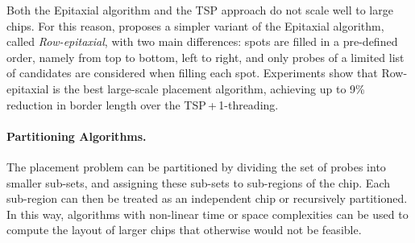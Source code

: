 \documentclass[english]{lni}
\newcommand{\ignore}[1]{}
\begin{document}
\ignore{
The major problem with the epitaxial and the TSP-based algorithm is that they
have at least quadratic time complexity and thus are not scalable for the
latest million-probe microarrays. According to their experiments, the TSP
approach needed around 32 minutes to produce the layout of a 200\,x\,200 chip,
whereas the epitaxial algorithm needed 74 minutes on average. For a 500\,x\,500
chip, the TSP took over 30 hours to complete, whereas the epitaxial algorithm
did not complete ``due to prohibitively large running time or memory
requirements'' \cite{KAHNG02}.
}

\ignore{
This observation has led to the development of two new algorithms by
\cite{KAHNG03A}. The first one, called sliding-window matching (SWM), is not
exactly a placement algorithm as it iteratively improves an initial placement
that can be constructed by, for instance, TSP and 1-threading. Improvements
are achieved by selecting an independent set of spots inside the window and
optimally replacing their probes using a minimum-weight perfect matching
algorithm. The term independent refers to probes that can be replaced without
affecting the border length of the other selected probes.
}

Both the Epitaxial algorithm and the TSP approach do not scale well to large
chips. For this reason, \cite{KAHNG03A} proposes a simpler variant of the
Epitaxial algorithm, called \emph{Row-epitaxial}, with two main differences:
spots are filled in a pre-defined order, namely from top to bottom, left to
right, and only probes of a limited list of candidates are considered when
filling each spot. Experiments show that Row-epitaxial is the best
large-scale placement algorithm, achieving up to 9\% reduction in border
length over the TSP\,+\,1-threading.

\paragraph{Partitioning Algorithms.}
The placement problem can be partitioned by dividing the set of probes into
smaller sub-sets, and assigning these sub-sets to sub-regions of the chip.
Each sub-region can then be treated as an independent chip or recursively
partitioned. 
In this way, algorithms with non-linear time or space
complexities can be used to compute the layout of larger chips that otherwise
would not be feasible.
\end{document}
